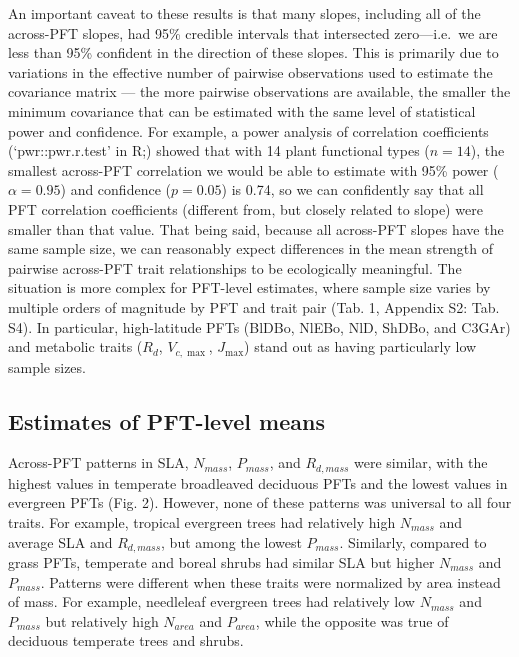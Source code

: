 \documentclass{article}
\begin{document}
An important caveat to these results is that many slopes, including all of the across-PFT slopes, had 95\% credible intervals that intersected zero---i.e.\ we are less than 95\% confident in the direction of these slopes.
This is primarily due to variations in the effective number of pairwise observations used to estimate the covariance matrix ---
the more pairwise observations are available, the smaller the minimum covariance that can be estimated with the same level of statistical power and confidence.
For example, a power analysis of correlation coefficients (`pwr::pwr.r.test' in R;\@\citealt{r_pwr_package}) showed that with 14 plant functional types ($n = 14$),
the smallest across-PFT correlation we would be able to estimate with 95\% power ($\alpha = 0.95$) and confidence ($p = 0.05$) is 0.74,
so we can confidently say that all PFT correlation coefficients (different from, but closely related to slope) were smaller than that value.
That being said, because all across-PFT slopes have the same sample size,
we can reasonably expect differences in the mean strength of pairwise across-PFT trait relationships to be ecologically meaningful.
The situation is more complex for PFT-level estimates, where sample size varies by multiple orders of magnitude by PFT and trait pair (Tab. 1, Appendix S2: Tab. S4).
In particular, high-latitude PFTs (BlDBo, NlEBo, NlD, ShDBo, and C3GAr) and metabolic traits ($R_d$, $V_{c,\max}$, $J_{\max}$) stand out as having particularly low sample sizes.

\subsection{Estimates of PFT-level means}

Across-PFT patterns in SLA, $N_{mass}$, $P_{mass}$, and $R_{d,mass}$ were similar,
with the highest values in temperate broadleaved deciduous PFTs and the lowest values in evergreen PFTs (Fig. 2).
However, none of these patterns was universal to all four traits.
For example, tropical evergreen trees had relatively high $N_{mass}$ and average SLA and $R_{d,mass}$, but among the lowest $P_{mass}$.
Similarly, compared to grass PFTs, temperate and boreal shrubs had similar SLA but higher $N_{mass}$ and $P_{mass}$.
Patterns were different when these traits were normalized by area instead of mass.
For example, needleleaf evergreen trees had relatively low $N_{mass}$ and $P_{mass}$ but relatively high $N_{area}$ and $P_{area}$, while the opposite was true of deciduous temperate trees and shrubs.
\end{document}
